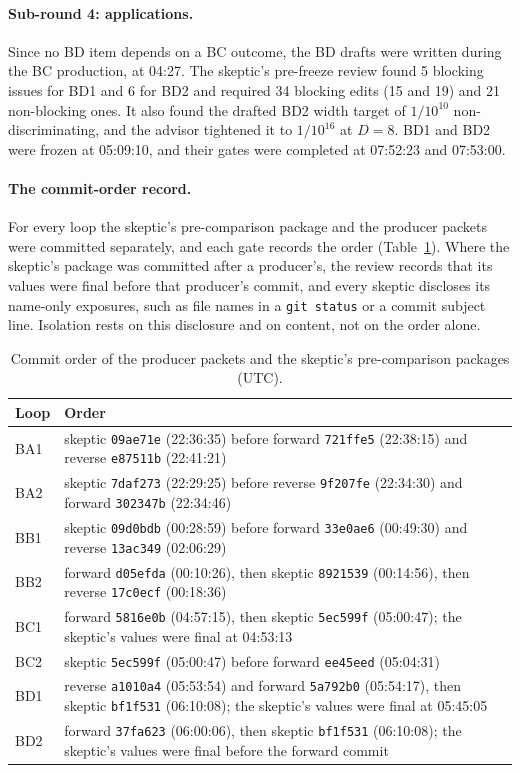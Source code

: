 \paragraph{Sub-round 4: applications.} Since no BD item depends on a BC
outcome, the BD drafts were written during the BC production, at 04:27. The
skeptic's pre-freeze review found 5 blocking issues for BD1 and 6 for BD2 and
required 34 blocking edits (15 and 19) and 21 non-blocking ones. It also found
the drafted BD2 width target of $1/10^{10}$ non-discriminating, and the
advisor tightened it to $1/10^{16}$ at $D=8$. BD1 and BD2 were frozen at
05:09:10, and their gates were completed at 07:52:23 and 07:53:00.

\paragraph{The commit-order record.} For every loop the skeptic's
pre-comparison package and the producer packets were committed separately,
and each gate records the order (Table~\ref{tab:history-commits}). Where the
skeptic's package was committed after a producer's, the review records that
its values were final before that producer's commit, and every skeptic
discloses its name-only exposures, such as file names in a \texttt{git
status} or a commit subject line. Isolation rests on this disclosure and on
content, not on the order alone.

\begin{table}[htbp]
\centering\small
\caption{Commit order of the producer packets and the skeptic's
pre-comparison packages (UTC).}
\label{tab:history-commits}
\begin{tabularx}{\linewidth}{@{}l>{\raggedright\arraybackslash}X@{}}
\toprule
Loop & Order\\
\midrule
BA1 & skeptic \texttt{09ae71e} (22:36:35) before forward \texttt{721ffe5} (22:38:15) and reverse \texttt{e87511b} (22:41:21)\\
BA2 & skeptic \texttt{7daf273} (22:29:25) before reverse \texttt{9f207fe} (22:34:30) and forward \texttt{302347b} (22:34:46)\\
BB1 & skeptic \texttt{09d0bdb} (00:28:59) before forward \texttt{33e0ae6} (00:49:30) and reverse \texttt{13ac349} (02:06:29)\\
BB2 & forward \texttt{d05efda} (00:10:26), then skeptic \texttt{8921539} (00:14:56), then reverse \texttt{17c0ecf} (00:18:36)\\
BC1 & forward \texttt{5816e0b} (04:57:15), then skeptic \texttt{5ec599f} (05:00:47); the skeptic's values were final at 04:53:13\\
BC2 & skeptic \texttt{5ec599f} (05:00:47) before forward \texttt{ee45eed} (05:04:31)\\
BD1 & reverse \texttt{a1010a4} (05:53:54) and forward \texttt{5a792b0} (05:54:17), then skeptic \texttt{bf1f531} (06:10:08); the skeptic's values were final at 05:45:05\\
BD2 & forward \texttt{37fa623} (06:00:06), then skeptic \texttt{bf1f531} (06:10:08); the skeptic's values were final before the forward commit\\
\bottomrule
\end{tabularx}
\end{table}

